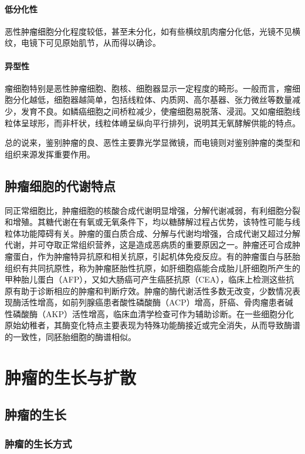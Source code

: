 \paragraph{低分化性}
恶性肿瘤细胞分化程度较低，甚至未分化，如有些横纹肌肉瘤分化低，光镜不见横纹，电镜下可见原始肌节，从而得以确诊。

\paragraph{异型性}
瘤细胞特别是恶性肿瘤细胞、胞核、细胞器显示一定程度的畸形。一般而言，瘤细胞分化越低，细胞器越简单，包括线粒体、内质网、高尔基器、张力微丝等数量减少，发育不良。如鳞癌细胞之间桥粒减少，使瘤细胞易脱落、浸润。又如瘤细胞线粒体呈球形，而非杆状，线粒体嵴呈纵向平行排列，说明其无氧酵解供能的特点。

总的说来，鉴别肿瘤的良、恶性主要靠光学显微镜，而电镜则对鉴别肿瘤的类型和组织来源发挥重要作用。

\subsection{肿瘤细胞的代谢特点}

同正常细胞比，肿瘤细胞的核酸合成代谢明显增强，分解代谢减弱，有利细胞分裂和增殖。其糖代谢在有氧或无氧条件下，均以糖酵解过程占优势，该特性可能与线粒体功能障碍有关。肿瘤的蛋白质合成、分解与代谢均增强，合成代谢又超过分解代谢，并可夺取正常组织营养，这是造成恶病质的重要原因之一。肿瘤还可合成肿瘤蛋白，作为肿瘤特异抗原和相关抗原，引起机体免疫反应。有的肿瘤蛋白与胚胎组织有共同抗原性，称为肿瘤胚胎性抗原，如肝细胞癌能合成胎儿肝细胞所产生的甲种胎儿蛋白（AFP），又如大肠癌可产生癌胚抗原（CEA），临床上检测这些抗原有助于诊断相应的肿瘤和判断疗效。肿瘤的酶代谢活性多数无改变，少数情况表现酶活性增高，如前列腺癌患者酸性磷酸酶（ACP）增高，肝癌、骨肉瘤患者碱性磷酸酶（AKP）活性增高，临床血清学检查可作为辅助诊断。在一些细胞分化原始幼稚者，其酶变化特点主要表现为特殊功能酶接近或完全消失，从而导致酶谱的一致性，同胚胎细胞的酶谱相似。

\section{肿瘤的生长与扩散}

\subsection{肿瘤的生长}

\subsubsection{肿瘤的生长方式}

